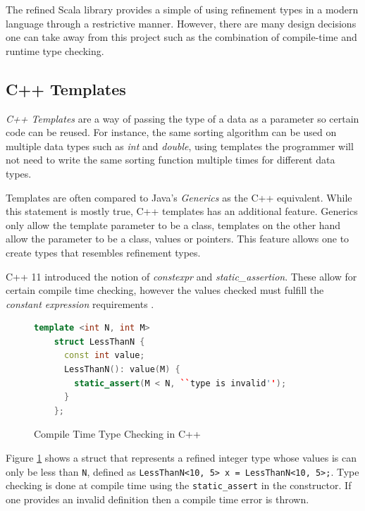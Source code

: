 \documentclass[a4paper,12pt]{report}
\begin{document}
\par
The refined Scala library provides a simple of using refinement types in a modern 
language through a restrictive manner. However, there are many design decisions 
one can take away from this project such as the combination of compile-time and 
runtime type checking. 

\subsection{C++ Templates} \label{section:cpp_templates}
\textit{C++ Templates} \cite{cppTemplate} are a way of passing the type of a 
data as a parameter so certain code can be reused. For instance, the same 
sorting algorithm can be used on multiple data types such as \textit{int} and 
\textit{double}, using templates the programmer will not need to write the same 
sorting function multiple times for different data types. 

\par
Templates are often compared to Java's \textit{Generics} \cite{javaGenerics} 
as the C++ equivalent. While this statement is mostly true, C++ templates 
has an additional feature. Generics only allow the template parameter to be a 
class, templates on the other hand allow the parameter to be a class, values 
or pointers. This feature allows one to create types that resembles refinement types. 

\par
C++ 11 introduced the notion of 
\textit{constexpr} and \textit{static\_assertion}. These allow for certain 
compile time checking, however the values checked must fulfill 
the \textit{constant expression} requirements \cite{cppConstExpr}. 

\begin{figure}[H]
  \begin{lstlisting}[language=c++]     
    template <int N, int M>
    struct LessThanN {
      const int value;
      LessThanN(): value(M) {
        static_assert(M < N, ``type is invalid'');
      }
    };
  \end{lstlisting}
  \caption{Compile Time Type Checking in C++}
  \label{code:compileLTN}
\end{figure}

\par
Figure \ref{code:compileLTN} shows a struct that represents a refined integer 
type whose values is can only be less than \verb|N|, defined as 
\verb|LessThanN<10, 5> x = LessThanN<10, 5>;|. Type checking is done at compile 
time using the \verb|static_assert| in the constructor. If one provides an 
invalid definition then a compile time error is thrown. 
\end{document}

